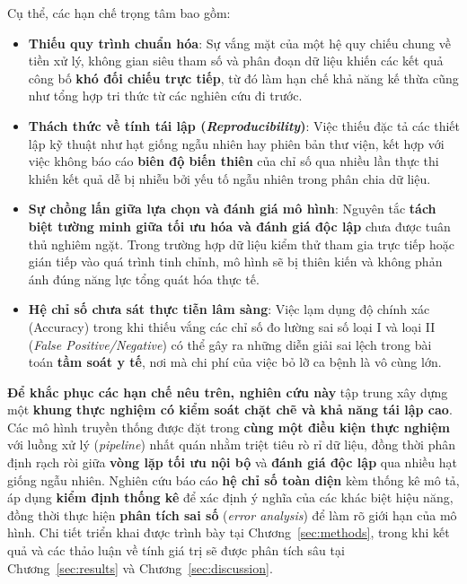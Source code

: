\documentclass[14pt,a4paper]{extreport}
\begin{document}
Cụ thể, các hạn chế trọng tâm bao gồm:

\begin{itemize}
    \item \textbf{Thiếu quy trình chuẩn hóa}: Sự vắng mặt của một hệ quy chiếu chung về tiền xử lý, không gian siêu tham số và phân đoạn dữ liệu khiến các kết quả công bố \textbf{khó đối chiếu trực tiếp}, từ đó làm hạn chế khả năng kế thừa cũng như tổng hợp tri thức từ các nghiên cứu đi trước.\cite{chang2022pima,miao2021pima}
    \item \textbf{Thách thức về tính tái lập (\textit{Reproducibility})}: Việc thiếu đặc tả các thiết lập kỹ thuật như hạt giống ngẫu nhiên hay phiên bản thư viện, kết hợp với việc không báo cáo \textbf{biên độ biến thiên} của chỉ số qua nhiều lần thực thi khiến kết quả dễ bị nhiễu bởi yếu tố ngẫu nhiên trong phân chia dữ liệu.\cite{pedregosa2011}
    \item \textbf{Sự chồng lấn giữa lựa chọn và đánh giá mô hình}: Nguyên tắc \textbf{tách biệt tường minh giữa tối ưu hóa và đánh giá độc lập} chưa được tuân thủ nghiêm ngặt. Trong trường hợp dữ liệu kiểm thử tham gia trực tiếp hoặc gián tiếp vào quá trình tinh chỉnh, mô hình sẽ bị thiên kiến và không phản ánh đúng năng lực tổng quát hóa thực tế.\cite{pedregosa2011}
    \item \textbf{Hệ chỉ số chưa sát thực tiễn lâm sàng}: Việc lạm dụng độ chính xác (Accuracy) trong khi thiếu vắng các chỉ số đo lường sai số loại I và loại II (\textit{False Positive/Negative}) có thể gây ra những diễn giải sai lệch trong bài toán \textbf{tầm soát y tế}, nơi mà chi phí của việc bỏ lỡ ca bệnh là vô cùng lớn.\cite{chang2022pima,kirbas2025shap}
\end{itemize}

\textbf{Để khắc phục các hạn chế nêu trên, nghiên cứu này} tập trung xây dựng một \textbf{khung thực nghiệm có kiểm soát chặt chẽ và khả năng tái lập cao}. Các mô hình truyền thống được đặt trong \textbf{cùng một điều kiện thực nghiệm} với luồng xử lý (\textit{pipeline}) nhất quán nhằm triệt tiêu rò rỉ dữ liệu, đồng thời phân định rạch ròi giữa \textbf{vòng lặp tối ưu nội bộ} và \textbf{đánh giá độc lập} qua nhiều hạt giống ngẫu nhiên. Nghiên cứu báo cáo \textbf{hệ chỉ số toàn diện} kèm thống kê mô tả, áp dụng \textbf{kiểm định thống kê} để xác định ý nghĩa của các khác biệt hiệu năng, đồng thời thực hiện \textbf{phân tích sai số} (\textit{error analysis}) để làm rõ giới hạn của mô hình. Chi tiết triển khai được trình bày tại Chương~\ref{sec:methods}, trong khi kết quả và các thảo luận về tính giá trị sẽ được phân tích sâu tại Chương~\ref{sec:results} và Chương~\ref{sec:discussion}.\cite{pedregosa2011}
\end{document}
